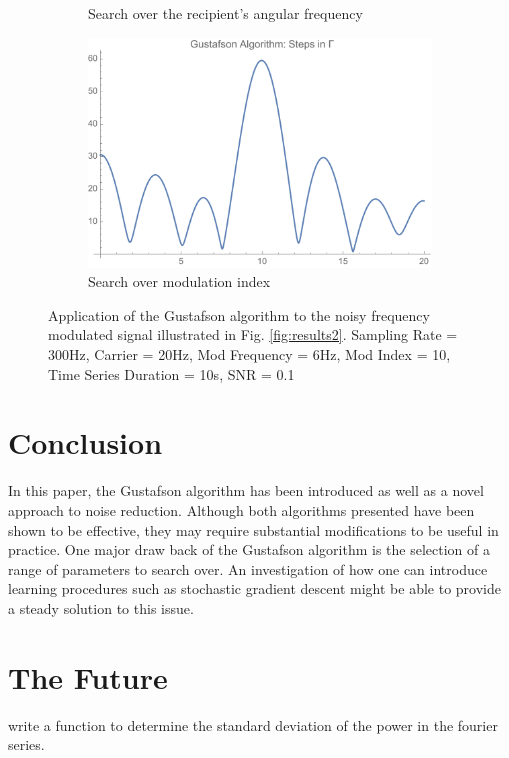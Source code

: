 \documentclass[onecolumn, groupedaddress, 10pt]{revtex4-1}
\begin{document}
\begin{figure}[H]
\begin{subfigure}{.5\textwidth}
  		\caption{\label{fig:result7} Search over the recipient's angular frequency}
	\end{subfigure}%
	\begin{subfigure}{.5\textwidth}
  		\centering
  		\includegraphics[width=.9\linewidth]{gustafsonAlgoStepInGamma.pdf}
  		\caption{\label{fig:result8} Search over modulation index}
	\end{subfigure}
	\caption{\label{fig:gustafsonAlgoResults} Application of the Gustafson algorithm to the noisy frequency modulated signal illustrated in Fig. \ref{fig:results2}.  Sampling Rate = 300Hz, Carrier = 20Hz, Mod Frequency = 6Hz, Mod Index = 10, Time Series Duration = 10s, SNR = 0.1}
\end{figure}

\section{Conclusion}
In this paper, the Gustafson algorithm has been introduced as well as a novel approach to noise reduction. Although both algorithms presented have been shown to be effective, they may require substantial modifications to be useful in practice. One major draw back of the Gustafson algorithm is the selection of a range of parameters to search over. An investigation of how one can introduce learning procedures such as stochastic gradient descent might be able to provide a steady solution to this issue.



\section{The Future}
write a function to determine the standard deviation of the power in the fourier series.
\end{document}
